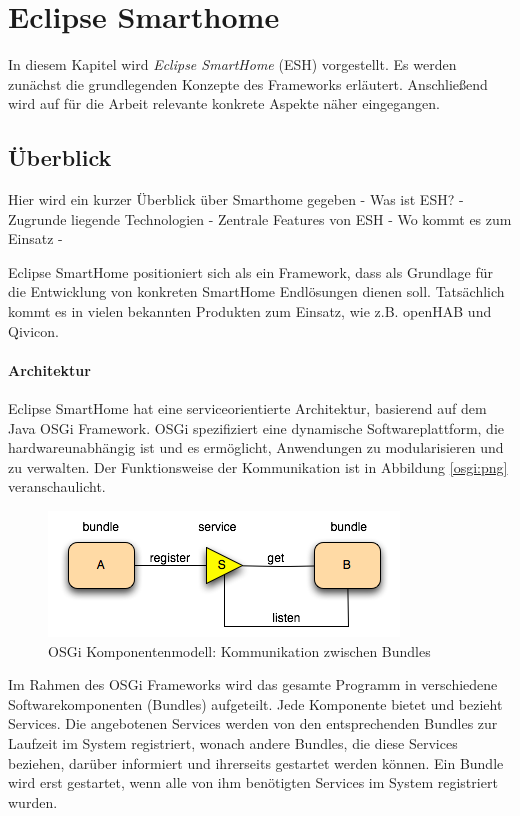 \chapter{Eclipse Smarthome}
\label{chap:esh}
In diesem Kapitel wird \textit{Eclipse SmartHome} (ESH) vorgestellt. Es werden zunächst die grundlegenden Konzepte des Frameworks erläutert. Anschließend wird auf für die Arbeit relevante konkrete Aspekte näher eingegangen.

\section{Überblick}
Hier wird ein kurzer Überblick über Smarthome gegeben
- Was ist ESH?
- Zugrunde liegende Technologien
- Zentrale Features von ESH
- Wo kommt es zum Einsatz
-

Eclipse SmartHome positioniert sich als ein Framework, dass als Grundlage für die Entwicklung von konkreten SmartHome Endlösungen dienen soll. Tatsächlich kommt es in vielen bekannten Produkten zum Einsatz, wie z.B. openHAB und Qivicon. 


\subsubsection{Architektur}
Eclipse SmartHome hat eine serviceorientierte Architektur, basierend auf dem Java OSGi Framework. OSGi spezifiziert eine dynamische Softwareplattform, die hardwareunabhängig ist und es ermöglicht, Anwendungen zu modularisieren und zu verwalten. Der Funktionsweise der Kommunikation ist in Abbildung \ref{osgi:png} veranschaulicht.

\begin{figure}[h]
	\centering
	\includegraphics{bilder/osgi}
	\caption{OSGi Komponentenmodell: Kommunikation zwischen Bundles}
	\label{fig:osgi}
\end{figure}

Im Rahmen des OSGi Frameworks wird das gesamte Programm in verschiedene Softwarekomponenten (Bundles) aufgeteilt. Jede Komponente bietet und bezieht Services. Die angebotenen Services werden von den entsprechenden Bundles zur Laufzeit im System registriert, wonach andere Bundles, die diese Services beziehen, darüber informiert und ihrerseits gestartet werden können. Ein Bundle wird erst gestartet, wenn alle von ihm benötigten Services im System registriert wurden.\\

